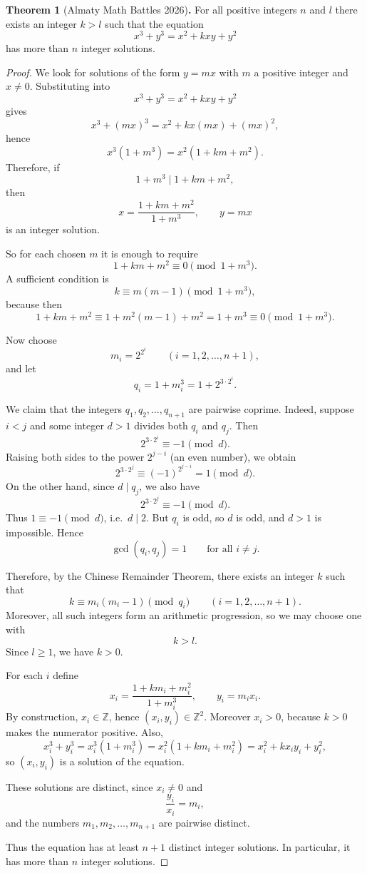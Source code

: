 \begin{thmbox}
\textbf{Theorem 1} (Almaty Math Battles 2026)\textbf{.}
For all positive integers $n$ and $l$ there exists an integer $k>l$ such that the equation
\[
x^3+y^3=x^2+kxy+y^2
\]
has more than $n$ integer solutions.
\end{thmbox}

\begin{proof}
We look for solutions of the form $y=mx$ with $m$ a positive integer and $x\neq 0$. Substituting into
\[
x^3+y^3=x^2+kxy+y^2
\]
gives
\[
x^3+(mx)^3=x^2+kx(mx)+(mx)^2,
\]
hence
\[
x^3(1+m^3)=x^2(1+km+m^2).
\]
Therefore, if
\[
1+m^3 \mid 1+km+m^2,
\]
then
\[
x=\frac{1+km+m^2}{1+m^3},\qquad y=mx
\]
is an integer solution.

So for each chosen $m$ it is enough to require
\[
1+km+m^2\equiv 0 \pmod{1+m^3}.
\]
A sufficient condition is
\[
k\equiv m(m-1)\pmod{1+m^3},
\]
because then
\[
1+km+m^2 \equiv 1+m^2(m-1)+m^2 = 1+m^3 \equiv 0 \pmod{1+m^3}.
\]

Now choose
\[
m_i=2^{2^i}\qquad (i=1,2,\dots,n+1),
\]
and let
\[
q_i=1+m_i^3=1+2^{3\cdot 2^i}.
\]

We claim that the integers $q_1,q_2,\dots,q_{n+1}$ are pairwise coprime.
Indeed, suppose $i<j$ and some integer $d>1$ divides both $q_i$ and $q_j$. Then
\[
2^{3\cdot 2^i}\equiv -1 \pmod d.
\]
Raising both sides to the power $2^{j-i}$ (an even number), we obtain
\[
2^{3\cdot 2^j}\equiv (-1)^{2^{j-i}}=1 \pmod d.
\]
On the other hand, since $d\mid q_j$, we also have
\[
2^{3\cdot 2^j}\equiv -1 \pmod d.
\]
Thus $1\equiv -1\pmod d$, i.e.\ $d\mid 2$. But $q_i$ is odd, so $d$ is odd, and $d>1$ is impossible. Hence
\[
\gcd(q_i,q_j)=1 \qquad \text{for all } i\ne j.
\]

Therefore, by the Chinese Remainder Theorem, there exists an integer $k$ such that
\[
k\equiv m_i(m_i-1)\pmod{q_i}
\qquad (i=1,2,\dots,n+1).
\]
Moreover, all such integers form an arithmetic progression, so we may choose one with
\[
k>l.
\]
Since $l\ge 1$, we have $k>0$.

For each $i$ define
\[
x_i=\frac{1+km_i+m_i^2}{1+m_i^3},\qquad y_i=m_i x_i.
\]
By construction, $x_i\in\mathbb Z$, hence $(x_i,y_i)\in\mathbb Z^2$. Moreover $x_i>0$, because $k>0$ makes the numerator positive. Also,
\[
x_i^3+y_i^3=x_i^3(1+m_i^3)
= x_i^2(1+km_i+m_i^2)
= x_i^2+kx_i y_i+y_i^2,
\]
so $(x_i,y_i)$ is a solution of the equation.

These solutions are distinct, since $x_i\ne 0$ and
\[
\frac{y_i}{x_i}=m_i,
\]
and the numbers $m_1,m_2,\dots,m_{n+1}$ are pairwise distinct.

Thus the equation has at least $n+1$ distinct integer solutions. In particular, it has more than $n$ integer solutions.
\end{proof}
